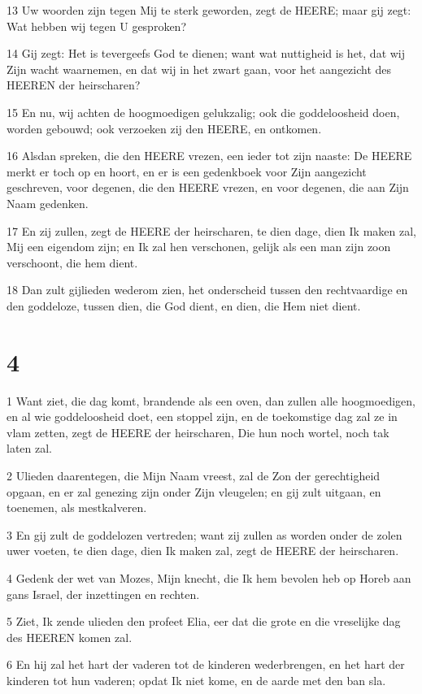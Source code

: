 \par 13 Uw woorden zijn tegen Mij te sterk geworden, zegt de HEERE; maar gij zegt: Wat hebben wij tegen U gesproken?
\par 14 Gij zegt: Het is tevergeefs God te dienen; want wat nuttigheid is het, dat wij Zijn wacht waarnemen, en dat wij in het zwart gaan, voor het aangezicht des HEEREN der heirscharen?
\par 15 En nu, wij achten de hoogmoedigen gelukzalig; ook die goddeloosheid doen, worden gebouwd; ook verzoeken zij den HEERE, en ontkomen.
\par 16 Alsdan spreken, die den HEERE vrezen, een ieder tot zijn naaste: De HEERE merkt er toch op en hoort, en er is een gedenkboek voor Zijn aangezicht geschreven, voor degenen, die den HEERE vrezen, en voor degenen, die aan Zijn Naam gedenken.
\par 17 En zij zullen, zegt de HEERE der heirscharen, te dien dage, dien Ik maken zal, Mij een eigendom zijn; en Ik zal hen verschonen, gelijk als een man zijn zoon verschoont, die hem dient.
\par 18 Dan zult gijlieden wederom zien, het onderscheid tussen den rechtvaardige en den goddeloze, tussen dien, die God dient, en dien, die Hem niet dient.

\chapter{4}

\par 1 Want ziet, die dag komt, brandende als een oven, dan zullen alle hoogmoedigen, en al wie goddeloosheid doet, een stoppel zijn, en de toekomstige dag zal ze in vlam zetten, zegt de HEERE der heirscharen, Die hun noch wortel, noch tak laten zal.
\par 2 Ulieden daarentegen, die Mijn Naam vreest, zal de Zon der gerechtigheid opgaan, en er zal genezing zijn onder Zijn vleugelen; en gij zult uitgaan, en toenemen, als mestkalveren.
\par 3 En gij zult de goddelozen vertreden; want zij zullen as worden onder de zolen uwer voeten, te dien dage, dien Ik maken zal, zegt de HEERE der heirscharen.
\par 4 Gedenk der wet van Mozes, Mijn knecht, die Ik hem bevolen heb op Horeb aan gans Israel, der inzettingen en rechten.
\par 5 Ziet, Ik zende ulieden den profeet Elia, eer dat die grote en die vreselijke dag des HEEREN komen zal.
\par 6 En hij zal het hart der vaderen tot de kinderen wederbrengen, en het hart der kinderen tot hun vaderen; opdat Ik niet kome, en de aarde met den ban sla.



